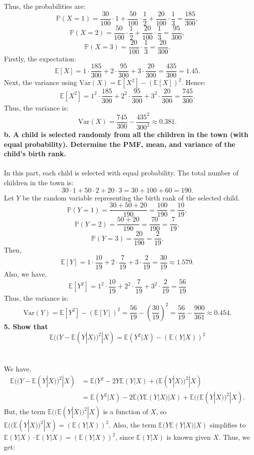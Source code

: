 \documentclass[a4paper,11pt]{article}
\begin{document}
 Thus, the probabilities are:
\[
\mathbb{P}(X = 1) = \frac{30}{100} \cdot 1 + \frac{50}{100} \cdot \frac{1}{2} + \frac{20}{100} \cdot \frac{1}{3} = \frac{185}{300},
\]
\[
\mathbb{P}(X = 2) = \frac{50}{100} \cdot \frac{1}{2} + \frac{20}{100} \cdot \frac{1}{3} = \frac{95}{300},
\]
\[
\mathbb{P}(X = 3) = \frac{20}{100} \cdot \frac{1}{3} = \frac{20}{300}.
\]
Firstly, the expectation:
\[
\boxed{
\mathbb{E}[X] = 1 \cdot \frac{185}{300} + 2 \cdot \frac{95}{300} + 3 \cdot \frac{20}{300} = \frac{435}{300} = 1.45.
}
\]
Next, the variance using $\text{Var}(X) = \mathbb{E}[X^2] - (\mathbb{E}[X])^2$. Hence:
\[
\mathbb{E}[X^2] = 1^2 \cdot \frac{185}{300} + 2^2 \cdot \frac{95}{300} + 3^2 \cdot \frac{20}{300} = \frac{745}{300}.
\]
Thus, the variance is:
\[
\boxed{
\text{Var}(X) = \frac{745}{300} - \frac{435^2}{300^2} \approx 0.381.
}
\]
\textbf{b. A child is selected randomly from all the children in the town (with equal probability). Determine the PMF, mean, and variance of the child’s birth rank.}
\\ \\
In this part, each child is selected with equal probability. The total number of children in the town is:
\[
30 \cdot 1 + 50 \cdot 2 + 20 \cdot 3 = 30 + 100 + 60 = 190.
\]
Let $Y$ be the random variable representing the birth rank of the selected child.
\[
\mathbb{P}(Y = 1) = \frac{30 + 50 + 20}{190} = \frac{100}{190} = \frac{10}{19},
\]
\[
\mathbb{P}(Y = 2) = \frac{50 + 20}{190} = \frac{70}{190} = \frac{7}{19},
\]
\[
\mathbb{P}(Y = 3) = \frac{20}{190} = \frac{2}{19}.
\]
Then,
\[
\boxed{
\mathbb{E}[Y] = 1 \cdot \frac{10}{19} + 2 \cdot \frac{7}{19} + 3 \cdot \frac{2}{19} = \frac{30}{19} \approx 1.579.
}
\]
Also, we have,
\[
\mathbb{E}[Y^2] = 1^2 \cdot \frac{10}{19} + 2^2 \cdot \frac{7}{19} + 3^2 \cdot \frac{2}{19} = \frac{56}{19} 
\]
Thus, the variance is:
\[
\boxed{
\text{Var}(Y) = \mathbb{E}[Y^2] - (\mathbb{E}[Y])^2 = \frac{56}{19} - \left(\frac{30}{19}\right)^2 = \frac{56}{19} - \frac{900}{361} \approx 0.454.
}
\]
\textbf{5. Show that
$$
\mathbb{E}((Y - \mathbb{E}(Y|X))^2|X) = \mathbb{E}(Y^2|X) - (\mathbb{E}(Y|X))^2
$$
}
\\ \\
We have,
\begin{align*}
    \mathbb{E}((Y - \mathbb{E}(Y|X))^2|X) &= \mathbb{E}(Y^2 - 2Y \mathbb{E}(Y|X) + (\mathbb{E}(Y|X))^2 | X) \\
    &= \mathbb{E}(Y^2|X) - 2\mathbb{E}(Y \mathbb{E}(Y|X)|X) + \mathbb{E}((\mathbb{E}(Y|X))^2|X).
\end{align*}
But, the term \(\mathbb{E}((\mathbb{E}(Y|X))^2|X)\) is a function of \(X\), so \(\mathbb{E}((\mathbb{E}(Y|X))^2|X) = (\mathbb{E}(Y|X))^2\). Also, the term \(\mathbb{E}(Y \mathbb{E}(Y|X)|X)\) simplifies to \(\mathbb{E}(Y|X) \cdot \mathbb{E}(Y|X) = (\mathbb{E}(Y|X))^2\), since \(\mathbb{E}(Y|X)\) is known given \(X\). Thus, we get:
\end{document}
